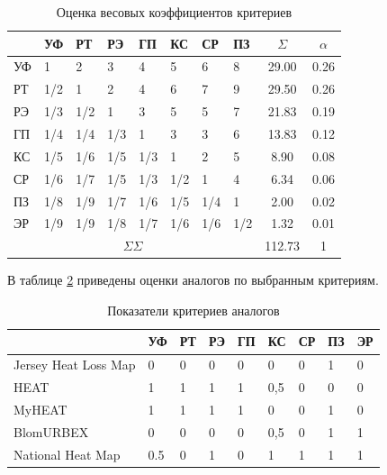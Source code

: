 	\begin{table}
		\begin{raggedright}
			\caption{Оценка весовых коэффициентов критериев}
			\begin{tabular}{ | p{} | l | l | l | l | l | l | l | c | c | }	
				\hline
				   & УФ & РТ & РЭ & ГП & КС & СР & ПЗ & $\Sigma$ & $\alpha$ \\
				\hline
				УФ &1   &2   &3   &4   &5   &6   &8   &29.00 &0.26 \\
				\hline
				РТ &1/2 &1   &2   &4   &6   &7   &9   &29.50 &0.26 \\
				\hline
				РЭ &1/3 &1/2 &1   &3   &5   &5   &7   &21.83 &0.19 \\
				\hline
				ГП &1/4 &1/4 &1/3 &1 &  3   &3   &6   &13.83 &0.12 \\
				\hline
				КС &1/5 &1/6 &1/5 &1/3 &1   &2   &5   &8.90  &0.08 \\
				\hline
				СР &1/6 &1/7 &1/5 &1/3 &1/2 &1   &4   &6.34  &0.06 \\
				\hline
				ПЗ &1/8 &1/9 &1/7 &1/6 &1/5 &1/4 &1   &2.00  &0.02 \\
				\hline
				ЭР &1/9 &1/9 &1/8 &1/7 &1/6 &1/6 &1/2 &1.32  &0.01 \\
				\hline 
				\multicolumn{8}{|c|}{$\Sigma\Sigma$}           &112.73 &1   \\
				\hline
			\end{tabular}
			\label{table:est}
		\end{raggedright}
	\end{table}

	В таблице \ref{table:critval} приведены оценки аналогов по выбранным критериям.

	\begin{table}[h!]
		\begin{raggedright}
			\caption{Показатели критериев аналогов}
			\begin{tabular}{ | p{} | l | l | l | l | l | l | l | l | }	
				\hline
				  	                        &УФ  &РТ &РЭ &ГП &КС  &СР &ПЗ &ЭР \\
				\hline
					Jersey Heat Loss Map 	&0   &0  &0  &0  &0   &0  &1 &0 \\
				\hline
					HEAT 					&1   &1  &1  &1  &0,5 &0  &0 &0 \\
				\hline
					MyHEAT 					&1   &1  &1  &1  &0   &0  &1 &0 \\
				\hline
					BlomURBEX 				&0   &0  &0  &0  &0,5 &0  &1 &1 \\
				\hline
					National Heat Map 		&0.5 &0  &1  &0  &1   &1  &1 &1 \\
				\hline
			\end{tabular}
			\label{table:critval}
		\end{raggedright}
	\end{table}

